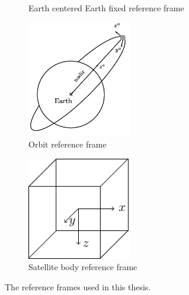 \begin{figure}[H]
\begin{subfigure}[b]{0.4\textwidth}
         \caption{Earth centered Earth fixed reference frame}
         \label{fig:ECEF}
     \end{subfigure}
     \hfill
     \begin{subfigure}[b]{\textwidth}
         \centering
        \includegraphics[width=0.5\textwidth]{Figures/ORF.pdf}
         \caption{Orbit reference frame}
         \label{fig:ORF}
     \end{subfigure}
     \hfill
     \begin{subfigure}[b]{0.4\textwidth}
         \centering
        \includegraphics[width=0.5\textwidth]{Figures/BRF.pdf}
         \caption{Satellite body reference frame}
         \label{fig:SBF}
     \end{subfigure}
        \caption{The reference frames used in this thesis.}
        \label{fig:three graphs}
\end{figure}  %

